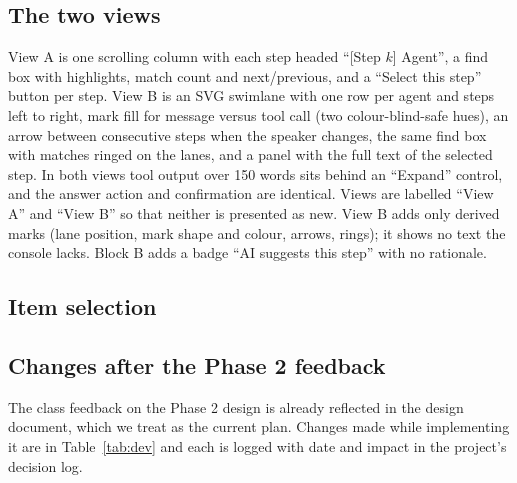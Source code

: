 \documentclass[conference]{IEEEtran}
\begin{document}
\subsection{The two views}
View A is one scrolling column with each step headed ``[Step $k$] Agent'', a find box with highlights, match count and next/previous, and a ``Select this step'' button per step. View B is an SVG swimlane with one row per agent and steps left to right, mark fill for message versus tool call (two colour-blind-safe hues), an arrow between consecutive steps when the speaker changes, the same find box with matches ringed on the lanes, and a panel with the full text of the selected step. In both views tool output over 150 words sits behind an ``Expand'' control, and the answer action and confirmation are identical. Views are labelled ``View A'' and ``View B'' so that neither is presented as new. View B adds only derived marks (lane position, mark shape and colour, arrows, rings); it shows no text the console lacks. Block B adds a badge ``AI suggests this step'' with no rationale.

\subsection{Item selection}
\noindent{}

\subsection{Changes after the Phase 2 feedback}
The class feedback on the Phase 2 design is already reflected in the design document, which we treat as the current plan. Changes made while implementing it are in Table~\ref{tab:dev} and each is logged with date and impact in the project's decision log.
\end{document}
